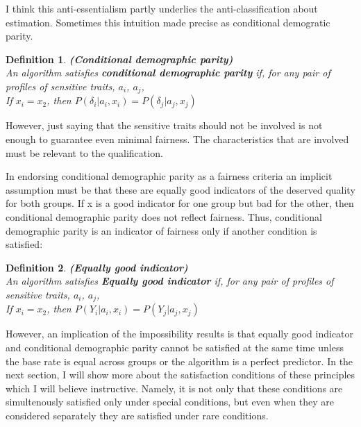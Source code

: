 \documentclass{article}
\newtheorem{definition}{Definition}
\begin{document}
I think this anti-essentialism partly underlies the anti-classification about estimation. Sometimes this intuition made precise as conditional demogratic parity. 

\begin{definition}
  \textup{\textbf{ (Conditional demographic parity) } \\
  \indent
  An algorithm satisfies \textbf{conditional demographic parity} if, for any pair of profiles of sensitive traits}, $a_i$,  $a_j$, \\
  
  \textup{If } $x_i = x_2$\textup{, then } $P(\delta_i|a_i, x_i) = P(\delta_j|a_j, x_j)$
  \end{definition}


However, just saying that the sensitive traits should not be involved is not enough to guarantee even minimal fairness. The characteristics that are involved must be relevant to the qualification. 

In endorsing conditional demographic parity as a fairness criteria an implicit assumption must be that these are equally good indicators of the deserved quality for both groups. If x is a good indicator for one group but bad for the other, then conditional demographic parity does not reflect fairness. Thus, conditional demographic parity is an indicator of fairness only if another condition is satisfied:

\begin{definition}
  \textup{\textbf{ (Equally good indicator) } \\
  \indent
  An algorithm satisfies \textbf{Equally good indicator} if, for any pair of profiles of sensitive traits}, $a_i$,  $a_j$, \\
  
  \textup{If } $x_i = x_2$\textup{, then } $P(Y_i|a_i, x_i) = P(Y_j|a_j, x_j)$
  \end{definition}

However, an implication of the impossibility results is that equally good indicator and conditional demographic parity cannot be satisfied at the same time unless the base rate is equal across groups or the algorithm is a perfect predictor. In the next section, I will show more about the satisfaction conditions of these principles which I will believe instructive. Namely, it is not only that these conditions are simultenously satisfied only under special conditions, but even when they are considered separately they are satisfied under rare conditions. %
\end{document}
